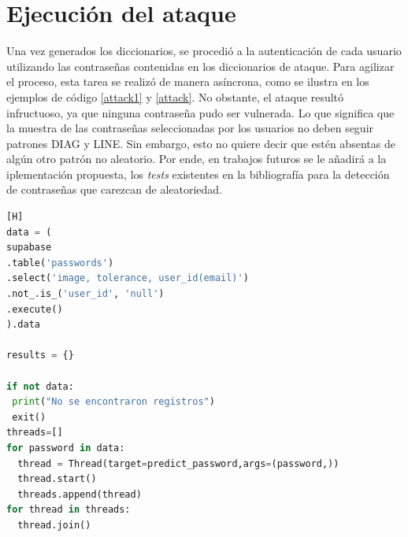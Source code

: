 \section{Ejecuci\'on del ataque}


Una vez generados los diccionarios, se procedió a la autenticación de cada usuario utilizando las contraseñas contenidas en los diccionarios de ataque. Para agilizar el proceso, esta tarea se realizó de manera asíncrona, como se ilustra en los ejemplos de código \ref{attack1} y \ref{attack}. No obstante, el ataque resultó infructuoso, ya que ninguna contraseña pudo ser vulnerada. Lo que significa que la muestra de las contrase\~nas seleccionadas por los usuarios no deben seguir patrones DIAG y LINE. Sin embargo, esto no quiere decir que est\'en absentas de alg\'un otro patr\'on no aleatorio. Por ende, en trabajos futuros se le a\~nadir\'a a la iplementaci\'on propuesta, los \textit{tests} existentes en la bibliograf\'ia para la detecci\'on de contrase\~nas que carezcan de aleatoriedad.
\bigskip\bigskip
\begin{lstlisting}[style=mystyle, language=Python, caption=C\'odigo del ataque, label=attack1][H]
data = (
supabase
.table('passwords')
.select('image, tolerance, user_id(email)')
.not_.is_('user_id', 'null')
.execute()
).data

results = {}

if not data:
 print("No se encontraron registros")
 exit()
threads=[]
for password in data:
  thread = Thread(target=predict_password,args=(password,))
  thread.start()
  threads.append(thread)
for thread in threads:
  thread.join()
\end{lstlisting}

\clearpage


